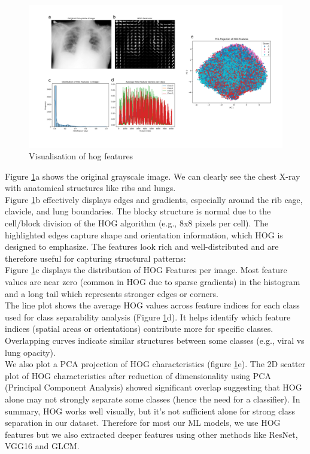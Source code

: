 \documentclass{article}
\begin{document}
\begin{figure}%
    \centering
    \includegraphics[width=1.0\linewidth]{hogfeatures_all.png}
    \caption{Visualisation of hog features}
    \label{fig:Visualisation of hog features}
\end{figure}
Figure \ref{fig:Visualisation of hog features}a shows the original grayscale image. We can clearly see the chest X-ray with anatomical structures 
like ribs and lungs.\\
Figure \ref{fig:Visualisation of hog features}b effectively displays edges and gradients, especially around the rib cage, clavicle, and lung boundaries. 
The blocky structure is normal due to the cell/block division of the HOG algorithm (e.g., 8x8 pixels per cell). The highlighted edges capture shape and 
orientation information, which HOG is designed to emphasize. The features look rich and well-distributed and are therefore useful for capturing structural patterns:\\
Figure \ref{fig:Visualisation of hog features}c displays the distribution of HOG Features per image. Most feature values are near zero (common in HOG due 
to sparse gradients) in the histogram and a long tail which represents stronger edges or corners.\\
The line plot shows the average HOG values across feature indices for each class used for class separability analysis 
(Figure \ref{fig:Visualisation of hog features}d). It helps identify which feature indices (spatial areas or orientations) contribute more for specific classes. 
Overlapping curves indicate similar structures between some classes (e.g., viral vs lung opacity).\\
We also plot a PCA projection of HOG characteristics (figure \ref{fig:Visualisation of hog features}e). The 2D scatter plot of HOG characteristics 
after reduction of dimensionality using PCA (Principal Component Analysis) showed significant overlap suggesting that HOG alone may not strongly separate 
some classes (hence the need for a classifier).
In summary, HOG works well visually, but it’s not sufficient alone for strong class separation in our dataset. Therefore for most our ML models, 
we use HOG features but we also extracted deeper features using other methods like ResNet, VGG16 and GLCM.
\\
\end{document}

